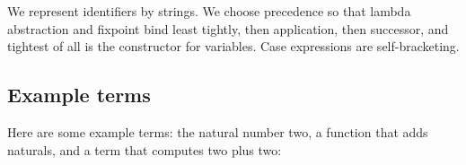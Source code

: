 \begin{fence}
\begin{code}
\>[26]\AgdaSymbol{:}%
\>[29]\AgdaSpace{}%
\AgdaSpace{}%
\<%
\\
%
\>[2]%
\>[26]\AgdaSymbol{:}%
\>[29]\AgdaSpace{}%
\AgdaSpace{}%
\AgdaSpace{}%
\AgdaSpace{}%
\AgdaSpace{}%
\AgdaSpace{}%
\AgdaSpace{}%
\AgdaSpace{}%
\<%
\\
%
\>[2]%
\>[26]\AgdaSymbol{:}%
\>[29]\AgdaSpace{}%
\AgdaSpace{}%
\AgdaSpace{}%
\AgdaSpace{}%
\<%
\end{code}
\end{fence}

We represent identifiers by strings. We choose precedence so that lambda
abstraction and fixpoint bind least tightly, then application, then
successor, and tightest of all is the constructor for variables. Case
expressions are self-bracketing.

\hypertarget{example-terms}{%
\subsection{Example terms}\label{example-terms}}

Here are some example terms: the natural number two, a function that
adds naturals, and a term that computes two plus two:

